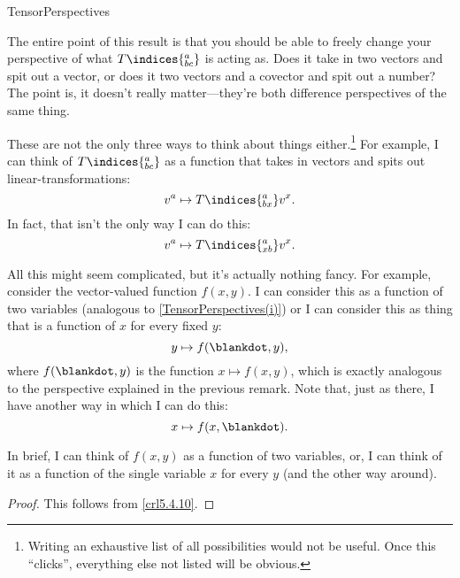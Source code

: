 \begin{thm}{}{TensorPerspectives}
\begin{rmk}
		The entire point of this result is that you should be able to freely change your perspective of what $T\indices{^a_{bc}}$ is acting as.  Does it take in two vectors and spit out a vector, or does it two vectors and a covector and spit out a number?  The point is, it doesn't really matter---they're both difference perspectives of the same thing.
	\end{rmk}
	\begin{rmk}
		These are not the only three ways to think about things either.\footnote{Writing an exhaustive list of all possibilities would not be useful.  Once this ``clicks'', everything else not listed will be obvious.}  For example, I can think of $T\indices{^a_{bc}}$ as a function that takes in vectors and spits out linear-transformations:
		\begin{equation}
			v^a\mapsto T\indices{^a_{bx}}v^x.
		\end{equation}
		In fact, that isn't the only way I can do this:
		\begin{equation}
			v^a\mapsto T\indices{^a_{xb}}v^x.
		\end{equation}
	\end{rmk}
	\begin{rmk}
		All this might seem complicated, but it's actually nothing fancy.  For example, consider the vector-valued function $f(x,y)$.  I can consider this as a function of two variables (analogous to \cref{TensorPerspectives(i)}) or I can consider this as thing that is a function of $x$ for every fixed $y$:
		\begin{equation}
			y\mapsto f(\blankdot ,y),
		\end{equation}
		where $f(\blankdot ,y)$ is the function $x\mapsto f(x,y)$, which is exactly analogous to the perspective explained in the previous remark.  Note that, just as there, I have another way in which I can do this:
		\begin{equation}
			x\mapsto f(x,\blankdot ).
		\end{equation}
		
		In brief, I can think of $f(x,y)$ as a function of two variables, or, I can think of it as a function of the single variable $x$ for every $y$ (and the other way around).
	\end{rmk}
	\begin{proof}
		This follows from \cref{crl5.4.10}.
	\end{proof}
\end{thm}

